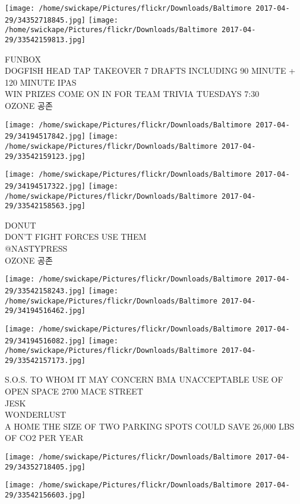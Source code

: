\documentclass[10pt,letterpaper]{article}
\begin{document}
\texttt{[image: /home/swickape/Pictures/flickr/Downloads/Baltimore 2017-04-29/34352718845.jpg]}
\texttt{[image: /home/swickape/Pictures/flickr/Downloads/Baltimore 2017-04-29/33542159813.jpg]}

FUNBOX\\
DOGFISH HEAD TAP TAKEOVER 7 DRAFTS INCLUDING 90 MINUTE + 120 MINUTE IPAS\\
WIN PRIZES COME ON IN FOR TEAM TRIVIA TUESDAYS 7:30\\
OZONE 공존\\
\pagebreak

\texttt{[image: /home/swickape/Pictures/flickr/Downloads/Baltimore 2017-04-29/34194517842.jpg]}
\texttt{[image: /home/swickape/Pictures/flickr/Downloads/Baltimore 2017-04-29/33542159123.jpg]}

\texttt{[image: /home/swickape/Pictures/flickr/Downloads/Baltimore 2017-04-29/34194517322.jpg]}
\texttt{[image: /home/swickape/Pictures/flickr/Downloads/Baltimore 2017-04-29/33542158563.jpg]}

DONUT\\
DON'T FIGHT FORCES USE THEM\\
@NASTYPRESS\\
OZONE 공존\\
\pagebreak

\texttt{[image: /home/swickape/Pictures/flickr/Downloads/Baltimore 2017-04-29/33542158243.jpg]}
\texttt{[image: /home/swickape/Pictures/flickr/Downloads/Baltimore 2017-04-29/34194516462.jpg]}

\texttt{[image: /home/swickape/Pictures/flickr/Downloads/Baltimore 2017-04-29/34194516082.jpg]}
\texttt{[image: /home/swickape/Pictures/flickr/Downloads/Baltimore 2017-04-29/33542157173.jpg]}

S.O.S. TO WHOM IT MAY CONCERN BMA UNACCEPTABLE USE OF OPEN SPACE 2700 MACE STREET\\
JESK\\
WONDERLUST\\
A HOME THE SIZE OF TWO PARKING SPOTS COULD SAVE 26,000 LBS OF CO2 PER YEAR\\
\pagebreak

\texttt{[image: /home/swickape/Pictures/flickr/Downloads/Baltimore 2017-04-29/34352718405.jpg]}

\vspace{0.25in}
\texttt{[image: /home/swickape/Pictures/flickr/Downloads/Baltimore 2017-04-29/33542156603.jpg]}
\end{document}
